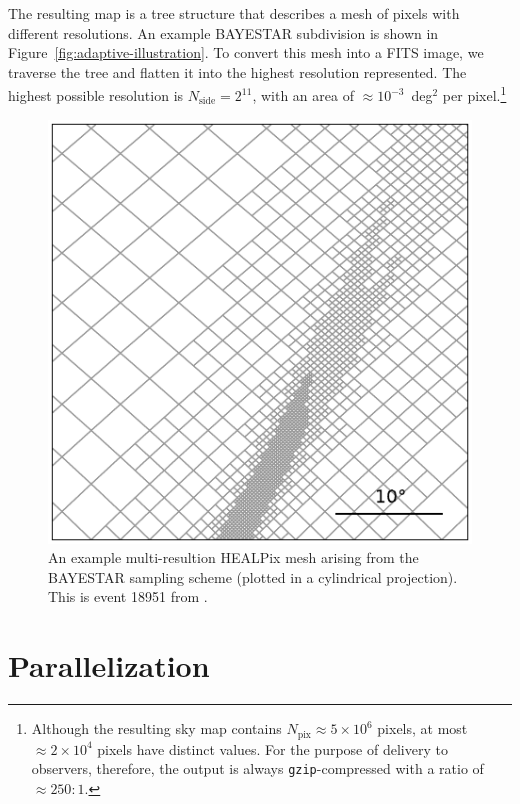 \documentclass[amsmath,amssymb,aps,prx,reprint,nopreprintnumbers,nofootinbib]{revtex4-1}
\begin{document}
The resulting map is a tree structure that describes a mesh of pixels with different resolutions. An example \ac{BAYESTAR} subdivision is shown in Figure~\ref{fig:adaptive-illustration}. To convert this mesh into a FITS image, 
we traverse the tree and flatten it into the highest resolution represented. The highest possible resolution is $N_\mathrm{side}=2^{11}$, with an area of $\approx 10^{-3}$~deg$^2$ per pixel.\footnote{Although the resulting sky map contains $N_\mathrm{pix} \approx 5\times10^6$ pixels, at most $\approx 2\times10^4$ pixels have distinct values. For the purpose of delivery to observers, therefore, the output is always \texttt{gzip}\nobreakdashes-compressed with a ratio of $\approx 250:1$.}

\begin{figure}
    \includegraphics[width=\columnwidth]{adaptive_mesh}
    \caption{\label{fig:adaptive-mesh}An example multi\nobreakdashes-resultion \ac{HEALPix} mesh arising from the \ac{BAYESTAR} sampling scheme (plotted in a cylindrical projection). This is event 18951 from \cite{FirstTwoYears}.}
\end{figure}

\section{Parallelization}
\end{document}

